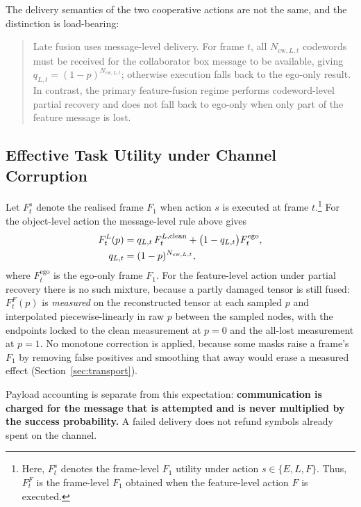 \documentclass[journal]{IEEEtran}
\begin{document}
The delivery semantics of the two cooperative actions are not the same, and the distinction is
load-bearing:

\begin{quote}
Late fusion uses message-level delivery. For frame $t$, all $N_{\mathrm{cw},L,t}$ codewords must be
received for the collaborator box message to be available, giving
$q_{L,t} = (1-p)^{N_{\mathrm{cw},L,t}}$; otherwise execution falls back to the ego-only result. In
contrast, the primary feature-fusion regime performs codeword-level partial recovery and does not
fall back to ego-only when only part of the feature message is lost.
\end{quote}

\subsection{Effective Task Utility under Channel Corruption}\label{sec:effective_utility}
Let $F_t^{s}$ denote the realised frame $F_1$ when action $s$ is executed at frame
$t$.\footnote{Here, $F_t^{s}$ denotes the frame-level $F_1$ utility under action
$s \in \{E, L, F\}$. Thus, $F_t^{F}$ is the frame-level $F_1$ obtained when the feature-level
action $F$ is executed.} For the
object-level action the message-level rule above gives
\begin{align}
F_t^{L}(p) &= q_{L,t}\,F_t^{L,\mathrm{clean}} + \bigl(1 - q_{L,t}\bigr) F_t^{\mathrm{ego}},
\notag \\
q_{L,t} &= (1-p)^{N_{\mathrm{cw},L,t}} ,
\label{eq:eff_L}
\end{align}
where $F_t^{\mathrm{ego}}$ is the ego-only frame $F_1$. For the feature-level action under partial
recovery there is no such mixture, because a partly damaged tensor is still fused: $F_t^{F}(p)$ is
\emph{measured} on the reconstructed tensor at each sampled $p$ and interpolated piecewise-linearly
in raw $p$ between the sampled nodes, with the endpoints locked to the clean measurement at $p = 0$
and the all-lost measurement at $p = 1$. No monotone correction is applied, because some masks raise
a frame's $F_1$ by removing false positives and smoothing that away would erase a measured effect
(Section~\ref{sec:transport}).

Payload accounting is separate from this expectation: \textbf{communication is
charged for the message that is attempted and is never multiplied by the success probability.} A
failed delivery does not refund symbols already spent on the channel.
\end{document}
